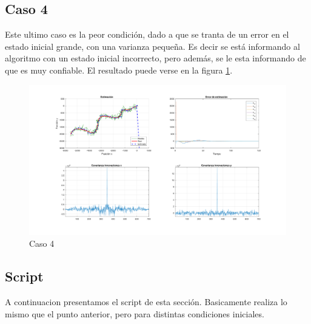 	\subsection{Caso 4}
	
	Este ultimo caso es la peor condición, dado a que se tranta de un error en el estado inicial grande, con una varianza pequeña. Es decir  se está informando al algoritmo con un estado inicial incorrecto, pero además, se le esta informando de que es muy confiable. El resultado puede verse en la figura \ref{fig:ej3d}.
	
		\begin{figure}[H]
			\centering
			\includegraphics[width=1.0\textwidth,keepaspectratio]{Figuras/graf_ej3d.pdf}
			\caption{Caso 4}
			\label{fig:ej3d}
		\end{figure}
		
	\subsection{Script}
	
		A continuacion presentamos el script de esta sección. Basicamente realiza lo mismo que el punto anterior, pero para distintas condiciones iniciales.

	
